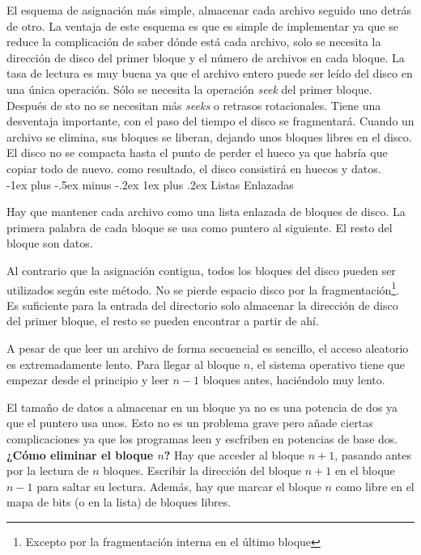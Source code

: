 \documentclass[10pt,portrait, twocolumn]{article}
\makeatletter
\renewcommand{\subsubsection}{\@startsection{subsubsection}{3}{0mm}%
                                {-1ex plus -.5ex minus -.2ex}%
                                {1ex plus .2ex}%
                                {\normalfont\small\bfseries}}
\makeatother
\begin{document}
El esquema de asignación más simple, almacenar cada archivo seguido uno detrás de otro. La ventaja de este esquema es que es simple de implementar ya que se reduce la complicación de saber dónde está cada archivo, solo se necesita la dirección de disco del primer bloque y el número de archivos en cada bloque. La tasa de lectura es muy buena ya que el archivo entero puede ser leído del disco en una única operación. Sólo se necesita la operación \textit{seek} del primer bloque. Después de sto no se necesitan más \textit{seeks} o retrasos rotacionales. Tiene una desventaja importante, con el paso del tiempo el disco se fragmentará. Cuando un archivo se elimina, sus bloques se liberan, dejando unos bloques libres en el disco. El disco no se compacta hasta el punto de perder el hueco ya que habría que copiar todo de nuevo. como resultado, el disco consistirá en huecos y datos.\\



\subsubsection{Listas Enlazadas}

Hay que mantener cada archivo como una lista enlazada de bloques de disco. La primera palabra de cada bloque se usa como puntero al siguiente. El resto del bloque son datos.

	\quad Al contrario que la asignación contigua, todos los bloques del disco pueden ser utilizados según este método. No se pierde espacio disco por la fragmentación\footnote{Excepto por la fragmentación interna en el último bloque}. Es suficiente para la entrada del directorio solo almacenar la dirección de disco del primer bloque, el resto se pueden encontrar a partir de ahí.
	
	\quad A pesar de que leer un archivo de forma secuencial es sencillo, el acceso aleatorio es extremadamente lento. Para llegar al bloque $n$, el sistema operativo tiene que empezar desde el principio y leer $n-1$ bloques antes, haciéndolo muy lento.
	
	\quad El tamaño de datos a almacenar en un bloque ya no es una potencia de dos ya que el puntero usa unos. Esto no es un problema grave pero añade ciertas complicaciones ya que los programas leen y escfriben en potencias de base dos.\\
	
	
\textbf{¿Cómo eliminar el bloque $n$?} Hay que acceder al bloque $n+1$, pasando antes por la lectura de $n$ bloques. Escribir  la dirección del bloque $n+1$ en el bloque $n-1$ para saltar su lectura. Además, hay que marcar el bloque $n$ como libre en el mapa de bits (o en la lista) de bloques libres.
	
\end{document}

